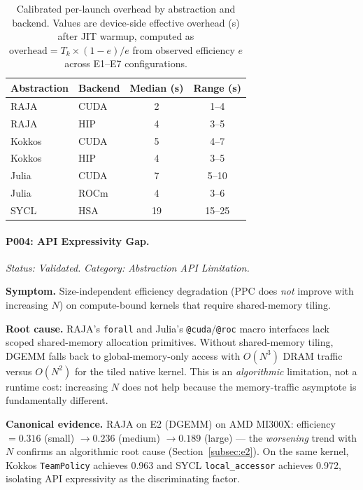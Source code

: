 \begin{table}[t]
\centering
\caption{Calibrated per-launch overhead by abstraction and backend.
Values are device-side effective overhead (\textmu{}s) after JIT warmup,
computed as $\text{overhead} = T_k \times (1 - e) / e$ from observed
efficiency $e$ across E1--E7 configurations.}
\label{tab:overhead}
\begin{tabular}{llcc}
\hline
\textbf{Abstraction} & \textbf{Backend} & \textbf{Median (\textmu{}s)}
& \textbf{Range (\textmu{}s)} \\
\hline
RAJA     & CUDA & 2  & 1--4  \\
RAJA     & HIP  & 4  & 3--5  \\
Kokkos   & CUDA & 5  & 4--7  \\
Kokkos   & HIP  & 4  & 3--5  \\
Julia    & CUDA & 7  & 5--10 \\
Julia    & ROCm & 4  & 3--6  \\
SYCL     & HSA  & 19 & 15--25 \\
\hline
\end{tabular}
\end{table}

\paragraph{P004: API Expressivity Gap.}
\textit{Status: Validated.}
\textit{Category: Abstraction API Limitation.}

\noindent\textbf{Symptom.}
Size-independent efficiency degradation (PPC does \emph{not} improve with
increasing $N$) on compute-bound kernels that require shared-memory tiling.

\noindent\textbf{Root cause.}
RAJA's \texttt{forall} and Julia's \texttt{@cuda}/\texttt{@roc} macro
interfaces lack scoped shared-memory allocation primitives. Without
shared-memory tiling, DGEMM falls back to global-memory-only access with
$O(N^3)$ DRAM traffic versus $O(N^2)$ for the tiled native kernel. This is an
\emph{algorithmic} limitation, not a runtime cost: increasing $N$ does not
help because the memory-traffic asymptote is fundamentally different.

\noindent\textbf{Canonical evidence.}
RAJA on E2 (DGEMM) on AMD MI300X: efficiency $= 0.316$ (small) $\rightarrow
0.236$ (medium) $\rightarrow 0.189$ (large) --- the \emph{worsening} trend
with $N$ confirms an algorithmic root cause (Section~\ref{subsec:e2}). On the
same kernel, Kokkos \texttt{TeamPolicy} achieves 0.963 and SYCL
\texttt{local\_accessor} achieves 0.972, isolating API expressivity as the
discriminating factor.

